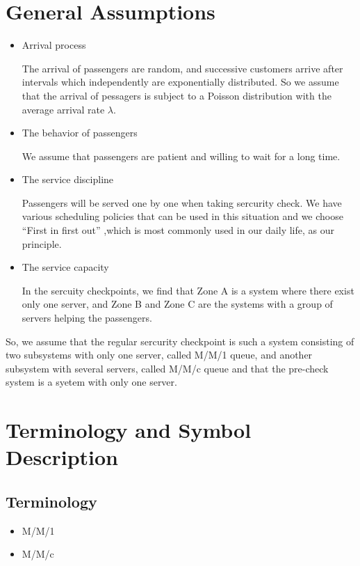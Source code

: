 \documentclass{mcmthesis}
\begin{document}
\section{General Assumptions}%

\begin{itemize}
			\item Arrival process
			
			 The arrival of passengers are random, and successive customers arrive after intervals which independently are exponentially distributed. So we assume that the arrival of pessagers is subject to a Poisson distribution with the average arrival rate ${\lambda}$.
			\item The behavior of passengers 
					
			 We assume that passengers are patient and willing to wait for a long time.
			\item The service discipline 
			
			 Passengers will be served one by one when taking sercurity check. We have various scheduling policies that can be used in this situation and we choose ``First in first out'' ,which is most commonly used in our daily life, as our principle.
			\item The service capacity 
			
			 In the sercuity checkpoints, we find that Zone A is a system where there exist only one server, and Zone B and Zone C are the systems with a group of servers helping the passengers.
\end{itemize}
		
	So, we assume that the regular sercurity checkpoint is such a system consisting of two subsystems with only one server, called M/M/1 queue, and another subsystem with several servers, called M/M/c queue and that the pre-check system is a syetem with only one server.

\section{Terminology and Symbol Description}%
\subsection{Terminology}
\begin{itemize}
	\item M/M/1
	\item M/M/c
\end{itemize}
\subsection{}
\end{document}
